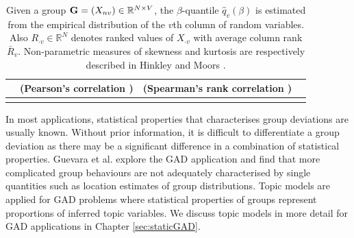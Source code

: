 \begin{table}[h]
\begin{center}
{\begin{tabular}{lccc  }
	 & (Pearson's correlation ) & (Spearman's rank correlation \cite{Spearman})\\[1mm] %
	 \hline\\[-2mm]
	 \end{tabular}
	 }
	\end{center}
	\caption{ Given a group ${\bf G} =(X_{nv})  \in \mathbb{R}^{ N \times V}$,  the $\beta$-quantile  $\hat{q}_v(\beta)$ is estimated from  the empirical distribution of the $v$th column of random variables. Also
$R_{\cdot v}  \in \mathbb{R}^{ N }$  denotes ranked values  of $X_{\cdot v}$ with average column rank $\bar R_v$.  %
Non-parametric measures of skewness and kurtosis are respectively described in 
Hinkley   \cite{hinkley1975} 
and Moors \cite{RobustK}.
}
 \label{Tab:Des}
\end{table}  
 
In most applications, statistical properties that characterises group deviations are usually known. Without prior information, it is difficult to differentiate a group deviation  as there may be a significant difference in a combination of statistical properties. %
  Guevara et al. \cite{SMDD} explore the GAD application and find that more complicated group behaviours are not adequately characterised by single quantities such as location estimates of group distributions. %
   Topic models are applied for GAD problems  where  statistical properties of  groups represent  proportions of inferred topic  variables.  %
  We  discuss topic models in more detail for  GAD applications in Chapter \ref{sec:staticGAD}.   



